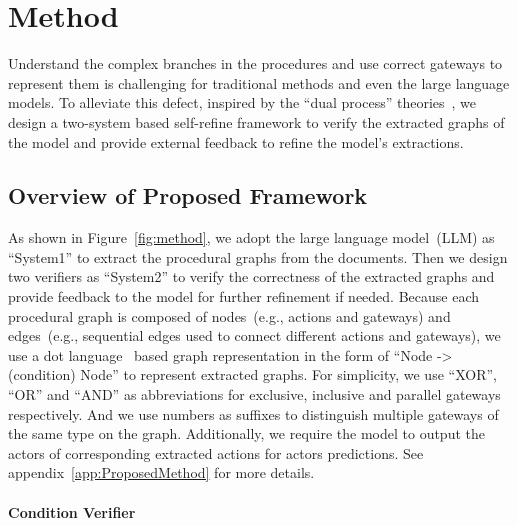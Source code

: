 

\section{Method
}

Understand the complex branches in the procedures and use correct gateways to represent them is challenging for traditional methods and even the large language models.
To alleviate this defect, inspired by the ``dual process'' theories~\citep{evans2003two}, we design a two-system based self-refine framework to verify the extracted graphs of the model and provide external feedback to refine the model's extractions.


\subsection{Overview of Proposed Framework
}

As shown in Figure~\ref{fig:method}, we adopt the large language model~(LLM) as ``System1'' to extract the procedural graphs from the documents. Then we design two verifiers as ``System2'' to verify the correctness of the extracted graphs and provide feedback to the model for further refinement if needed.
Because each procedural graph is composed of nodes~(e.g., actions and gateways) and edges~(e.g., sequential edges used to connect different actions and gateways),
we use a dot language~\citep{gansner2006drawing} based graph representation in the form of ``Node -> (condition) Node'' to represent extracted graphs.
For simplicity, we use ``XOR'', ``OR'' and ``AND'' as abbreviations for exclusive, inclusive and parallel gateways respectively. And we use numbers as suffixes to distinguish multiple gateways of the same type on the graph.
Additionally, we require the model to output the actors of corresponding extracted actions for actors predictions. See appendix~\ref{app:ProposedMethod} for more details.

\paragraph{Condition Verifier}

